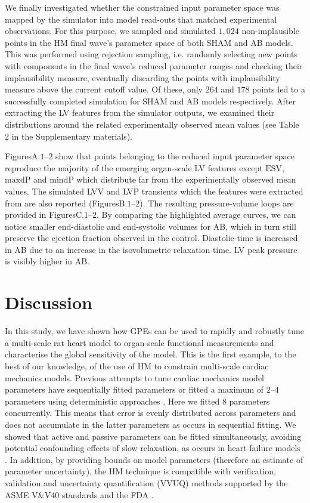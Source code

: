We finally investigated whether the constrained input parameter space was mapped by the simulator into model read-outs that matched experimental observations. For this purpose, we sampled and simulated $1,024$ non-implausible points in the HM final wave's parameter space of both SHAM and AB models. This was performed using rejection sampling, i.e. randomly selecting new points with components in the final wave's reduced parameter ranges and checking their implausibility measure, eventually discarding the points with implausibility measure above the current cutoff value. Of these, only $264$ and $178$ points led to a successfully completed simulation for SHAM and AB models respectively. After extracting the LV features from the simulator outputs, we examined their distributions around the related experimentally observed mean values (see Table~$2$ in the Supplementary materials).

FiguresA.$1$--$2$ show that points belonging to the reduced input parameter space reproduce the majority of the emerging organ-scale LV features except $\textrm{ESV}$, $\textrm{maxdP}$ and $\textrm{mindP}$ which distribute far from the experimentally observed mean values. The simulated LVV and LVP transients which the features were extracted from are also reported (FiguresB.$1$--$2$). The resulting pressure-volume loops are provided in FiguresC.$1$--$2$.
By comparing the highlighted average curves, we can notice smaller end-diastolic and end-systolic volumes for AB, which in turn still preserve the ejection fraction observed in the control. Diastolic-time is increased in AB due to an increase in the isovolumetric relaxation time. LV peak pressure is visibly higher in AB.

\section{Discussion}\label{sec:ch4discussion}
In this study, we have shown how GPEs can be used to rapidly and robustly tune a multi-scale rat heart model to organ-scale functional measurements and characterise the global sensitivity of the model. This is the first example, to the best of our knowledge, of the use of HM to constrain multi-scale cardiac mechanics models. Previous attempts to tune cardiac mechanics model parameters have sequentially fitted parameters \cite{Wang:2009} or fitted a maximum of $2$--$4$ parameters using deterministic approaches \cite{Lewalle:2018}. Here we fitted $8$ parameters concurrently. This means that error is evenly distributed across parameters and does not accumulate in the latter parameters as occurs in sequential fitting. We showed that active and passive parameters can be fitted simultaneously, avoiding potential confounding effects of slow relaxation, as occurs in heart failure models \cite{Xi:2013}. In addition, by providing bounds on model parameters (therefore an estimate of parameter uncertainty), the HM technique is compatible with verification, validation and uncertainty quantification (VVUQ) methods \cite{Patten:2009} supported by the ASME V$\&$V40 standards and the FDA \cite{Asme:2019}.

